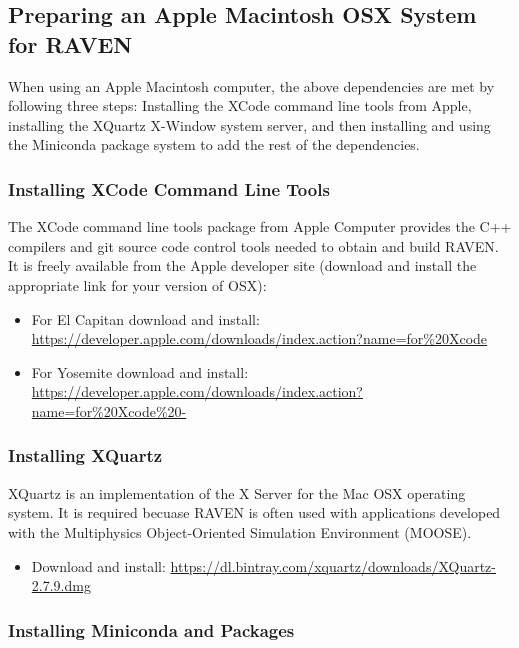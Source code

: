 \goToRavenInstallation

\subsection{Preparing an Apple Macintosh OSX System for RAVEN}
\label{sysprep_osx}

When using an Apple Macintosh computer, the above dependencies are met
by following three steps: Installing the XCode command line tools from Apple,
installing the XQuartz  X-Window system server, and then installing and using the Miniconda
package system to add the rest of the dependencies.

\subsubsection{Installing XCode Command Line Tools}

The XCode command line tools package from Apple Computer provides the C++
compilers and git source code control tools needed to obtain and build RAVEN.
It is freely available from the Apple developer site (download and install the appropriate link
for your version of OSX):
\begin{itemize}
    \item For El Capitan download and install: \url{https://developer.apple.com/downloads/index.action?name=for%20Xcode}
    \item For Yosemite download and install:  \url{https://developer.apple.com/downloads/index.action?name=for%20Xcode%20-}
\end{itemize}

\subsubsection{Installing XQuartz}
XQuartz is an implementation of the X Server for the Mac OSX operating system.  It is required
becuase RAVEN is often used with applications developed with the Multiphysics
Object-Oriented Simulation Environment (MOOSE).
\begin{itemize}
    \item Download and install: \url{https://dl.bintray.com/xquartz/downloads/XQuartz-2.7.9.dmg}
\end{itemize}

\subsubsection{Installing Miniconda and Packages}
\label{miniconda}

